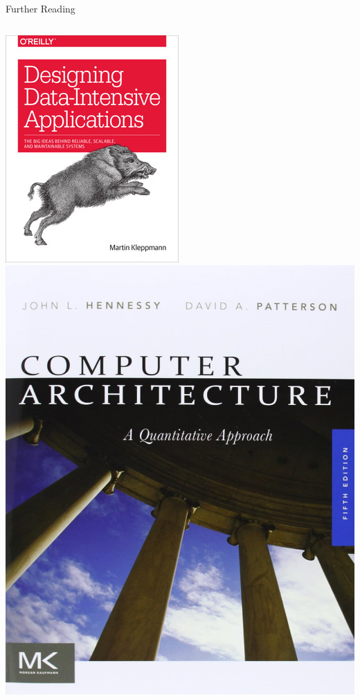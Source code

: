 \documentclass[12pt, aspectration=169]{beamer}
\begin{document}
\begin{frame}{Further Reading}
\begin{center}
\begin{columns}
                \includegraphics[scale=0.35]{static/images/designing_data_intensive_applications}
                \includegraphics[scale=0.075]{static/images/computer_architecture}
            \end{columns}
        \end{center}
    \end{frame}
\end{document}
